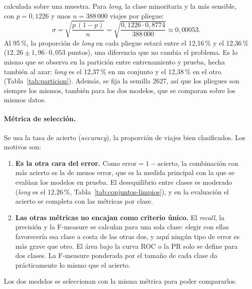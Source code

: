 \documentclass[12pt,a4paper]{article}
\begin{document}
calculada sobre una muestra\cite[cap.~5]{mitchell1997}. Para \textit{long}, la clase
minoritaria y la más sensible, con $p = 0{,}1226$ y unos $n = 388\,000$
viajes por pliegue:
\[
\sigma = \sqrt{\frac{p\,(1-p)}{n}} = \sqrt{\frac{0{,}1226 \cdot 0{,}8774}{388\,000}}
\approx 0{,}00053 .
\]
Al 95\,\%, la proporción de \textit{long} en cada pliegue estará entre el
12,16\,\% y el 12,36\,\% ($12{,}26 \pm 1{,}96 \cdot 0{,}053$ puntos), una
diferencia que no cambia el problema. Es lo mismo que se observa en la
partición entre entrenamiento y prueba, hecha también al azar: \textit{long}
es el 12,37\,\% en un conjunto y el 12,38\,\% en el otro
(Tabla~\ref{tab:particion}). Además, se fija la semilla 2627, así que los
pliegues son siempre los mismos, también para los dos modelos, que se
comparan sobre los mismos datos.
 
\paragraph{Métrica de selección.} Se usa la tasa de acierto
(\textit{accuracy}), la proporción de viajes bien clasificados. Los motivos
son:
\begin{enumerate}
    \item \textbf{Es la otra cara del error.} Como
    $\text{error} = 1 - \text{acierto}$, la combinación con más acierto es
    la de menos error, que es la medida principal con la que se evalúan los
    modelos en prueba. El desequilibrio entre clases es moderado
    (\textit{long} es el 12,26\,\%, Tabla~\ref{tab:conjuntos-limpios}), y en
    la evaluación el acierto se completa con las métricas por clase.
    \item \textbf{Las otras métricas no encajan como criterio único.} El
    \textit{recall}, la precisión y la F-measure se calculan para una sola
    clase: elegir con ellas favorecería esa clase a costa de las otras dos,
    y aquí ningún tipo de error es más grave que otro. El área bajo la curva
    \ac{ROC} o la \ac{PR} solo se define para dos clases. La F-measure ponderada por
    el tamaño de cada clase da prácticamente lo mismo que el acierto.
\end{enumerate}
Los dos modelos se seleccionan con la misma métrica para poder compararlos.
 
 
\end{document}
